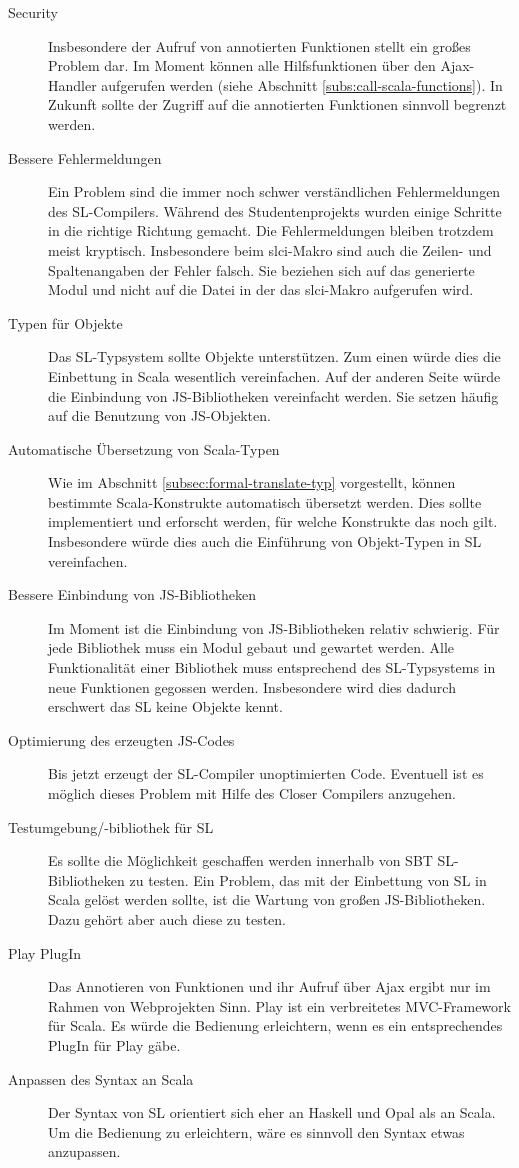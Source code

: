 \documentclass[12pt,bibtotoc]{scrreprt}
\begin{document}
\begin{description}
 \item[Security] Insbesondere der Aufruf von annotierten Funktionen stellt ein großes Problem dar. Im Moment können alle Hilfsfunktionen über den Ajax-Handler aufgerufen werden (siehe Abschnitt \ref{subs:call-scala-functions}). In Zukunft sollte der Zugriff auf die annotierten Funktionen sinnvoll begrenzt werden.
 \item[Bessere Fehlermeldungen] Ein Problem sind die immer noch schwer verständlichen Fehlermeldungen des SL-Compilers. Während des Studentenprojekts wurden einige Schritte in die richtige Richtung gemacht. Die Fehlermeldungen bleiben trotzdem meist kryptisch. Insbesondere beim slci-Makro sind auch die Zeilen- und Spaltenangaben der Fehler falsch. Sie beziehen sich auf das generierte Modul und nicht auf die Datei in der das slci-Makro aufgerufen wird. 
 \item[Typen für Objekte] Das SL-Typsystem sollte Objekte unterstützen. Zum einen würde dies die Einbettung in Scala wesentlich vereinfachen. Auf der anderen Seite würde die Einbindung von JS-Bibliotheken vereinfacht werden. Sie setzen häufig auf die Benutzung von JS-Objekten. 
 \item[Automatische Übersetzung von Scala-Typen] Wie im Abschnitt \ref{subsec:formal-translate-typ} vorgestellt, können bestimmte Scala-Konstrukte automatisch übersetzt werden. Dies sollte implementiert und erforscht werden, für welche Konstrukte das noch gilt. Insbesondere würde dies auch die Einführung von Objekt-Typen in SL vereinfachen.
 \item[Bessere Einbindung von JS-Bibliotheken] Im Moment ist die Einbindung von JS-Bibliotheken relativ schwierig. Für jede Bibliothek muss ein Modul gebaut und gewartet werden. Alle Funktionalität einer Bibliothek muss entsprechend des SL-Typsystems in neue Funktionen gegossen werden. Insbesondere wird dies dadurch erschwert das SL keine Objekte kennt.
 \item[Optimierung des erzeugten JS-Codes] Bis jetzt erzeugt der SL-Compiler unoptimierten Code. Eventuell ist es möglich dieses Problem mit Hilfe des Closer Compilers\cite{} anzugehen.
 \item[Testumgebung/-bibliothek für SL] Es sollte die Möglichkeit geschaffen werden innerhalb von SBT SL-Bibliotheken zu testen. Ein Problem, das mit der Einbettung von SL in Scala gelöst werden sollte, ist die Wartung von großen JS-Bibliotheken. Dazu gehört aber auch diese zu testen.
 \item[Play PlugIn] Das Annotieren von Funktionen und ihr Aufruf über Ajax ergibt nur im Rahmen von Webprojekten Sinn. Play ist ein verbreitetes MVC-Framework für Scala. Es würde die Bedienung erleichtern, wenn es ein entsprechendes PlugIn für Play gäbe. 
 \item[Anpassen des Syntax an Scala] Der Syntax von SL orientiert sich eher an Haskell und Opal als an Scala. Um die Bedienung zu erleichtern, wäre es sinnvoll den Syntax etwas anzupassen.
\end{description}
\end{document}
